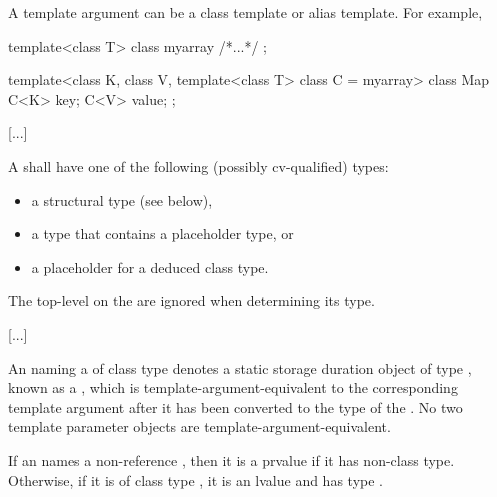 \documentclass{wg21}
\begin{document}
\begin{note}
A template argument 
can be a class template or alias template.
For example,

\begin{codeblock}
    template<class T> class myarray { /*...*/ };

    template<class K, class V, template<class T> class C = myarray>
    class Map {
        C<K> key;
        C<V> value;
    };
\end{codeblock}
\end{note}

\textcolor{noteclr}{[...]}

\pnum
A 
shall have one of the following (possibly cv-qualified) types:
\begin{itemize}
    \item a structural type (see below),
    \item a type that contains a placeholder type, or
    \item a placeholder for a deduced class type.
\end{itemize}
The top-level
on the
are ignored when determining its type.

\textcolor{noteclr}{[...]}

\pnum
An  naming
a 
of class type 
denotes a static storage duration object of type ,
known as a ,
which is template-argument-equivalent to
the corresponding template argument
after it has been converted
to the type of the  .
No two template parameter objects are template-argument-equivalent.
\begin{note}
    If an  names
    a  non-reference  ,
    then it is a prvalue if it has non-class type.
    Otherwise, if it is of class type ,
    it is an lvalue and has type  .
\end{note}
\end{document}
